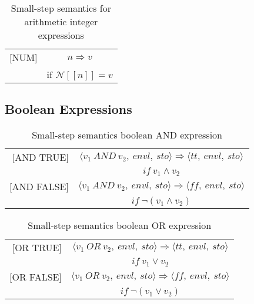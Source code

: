 \begin{table}[H]
    \centering
    \begin{longtable}[c] { r c }
        
        [NUM] & \( n \Rightarrow v \) 
         \\ \\
        & 
       \( \text{if } \mathcal{N} [[n]] = v \) \\
        
    \end{longtable}
    \caption{Small-step semantics for arithmetic integer expressions}
\end{table}

\subsection{Boolean Expressions}
\begin{table}[H]
    \centering
    \begin{longtable}[c] { r c }
        [AND TRUE] & \( \langle v_1 \ AND \ v_2, \ envl, \ sto \rangle \Rightarrow \langle \textit{tt}, \ envl, \ sto \rangle \) \\
                            &       \( if \ v_1 \land v_2\)
        \\

        [AND FALSE] & \( \langle v_1 \ AND \ v_2, \ envl, \ sto \rangle \Rightarrow \langle \textit{ff}, \ envl, \ sto \rangle \) \\
                            &       \( if \ 	\neg(v_1 \land v_2)\)
        \\
        
    \end{longtable}
    \caption{Small-step semantics boolean AND expression }
\end{table}

\begin{table}[H]
    \centering
  \begin{longtable}[c] { r c }
        [OR TRUE] & \( \langle v_1 \ OR \ v_2, \ envl, \ sto \rangle \Rightarrow \langle \textit{tt}, \ envl, \ sto \rangle \) \\
                            &       \( if \ v_1 \lor v_2\)
        \\

        [OR FALSE] & \( \langle v_1 \ OR \ v_2, \ envl, \ sto \rangle \Rightarrow \langle \textit{ff}, \ envl, \ sto \rangle \) \\
                            &       \( if \ 	\neg(v_1 \lor v_2)\)
        \\
        
    \end{longtable}
    \caption{Small-step semantics boolean OR expression }
\end{table}



